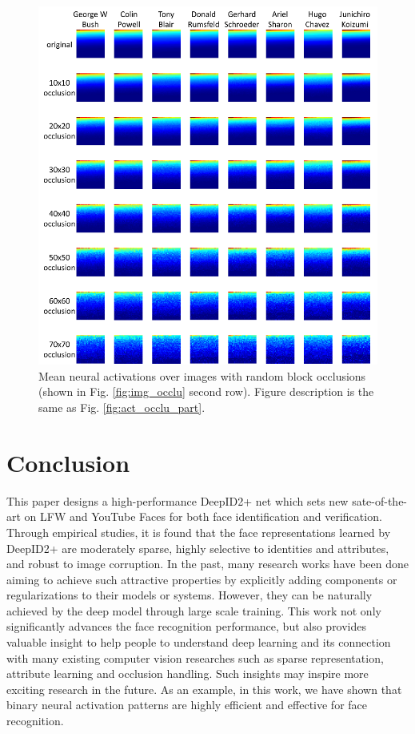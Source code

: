 \documentclass[10pt,twocolumn,letterpaper]{article}
\begin{document}
\begin{figure}[t]
\begin{center}
\includegraphics[width=0.95\linewidth]{picture/16d.png}
\end{center}
\vspace{-0.1in}
\caption{Mean neural activations over images with random block occlusions (shown in Fig. \ref{fig:img_occlu} second row). Figure description is the same as Fig. \ref{fig:act_occlu_part}.}
\label{fig:act_occlu_rb}
\vspace{-0.05in}
\end{figure}


\section{Conclusion}

This paper designs a high-performance DeepID2+ net which sets new sate-of-the-art on LFW and YouTube Faces for both face identification and verification. Through  empirical studies, it is found that the face representations learned by DeepID2+ are moderately sparse, highly selective to identities and attributes, and robust to image corruption. In the past, many research works have been done aiming to achieve such attractive properties by explicitly adding components or regularizations to their models or systems. However, they can be naturally achieved by the deep model through large scale training. This work not only significantly advances the face recognition performance, but also provides valuable insight to help people to understand deep learning and its connection with many existing computer vision researches such as sparse representation, attribute learning and occlusion handling. Such insights may inspire  more exciting research in the future. As an example, in this work, we have shown that binary neural activation patterns are highly efficient and effective for face recognition.

{\small


}
\end{document}
